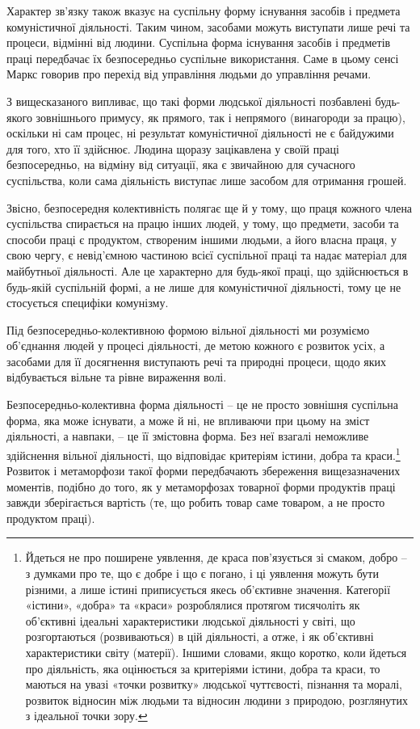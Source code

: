 \documentclass[../main]{subfiles}
\begin{document}
Характер зв’язку також вказує на суспільну форму існування засобів і предмета комуністичної діяльності. Таким чином, засобами можуть виступати лише речі та процеси, відмінні від людини. Суспільна форма існування засобів і предметів праці передбачає їх безпосередньо суспільне використання. Саме в цьому сенсі Маркс говорив про перехід від управління людьми до управління речами.

З вищесказаного випливає, що такі форми людської діяльності позбавлені будь-якого зовнішнього примусу, як прямого, так і непрямого (винагороди за працю), оскільки ні сам процес, ні результат комуністичної діяльності не є байдужими для того, хто її здійснює. Людина щоразу зацікавлена у своїй праці безпосередньо, на відміну від ситуації, яка є звичайною для сучасного суспільства, коли сама діяльність виступає лише засобом для отримання грошей.

Звісно, безпосередня колективність полягає ще й у тому, що праця кожного члена суспільства спирається на працю інших людей, у тому, що предмети, засоби та способи праці є продуктом, створеним іншими людьми, а його власна праця, у свою чергу, є невід’ємною частиною всієї суспільної праці та надає матеріал для майбутньої діяльності. Але це характерно для будь-якої праці, що здійснюється в будь-якій суспільній формі, а не лише для комуністичної діяльності, тому це не стосується специфіки комунізму.

Під безпосередньо-колективною формою вільної діяльності ми розуміємо об’єднання людей у процесі діяльності, де метою кожного є розвиток усіх, а засобами для її досягнення виступають речі та природні процеси, щодо яких відбувається вільне та рівне вираження волі.

Безпосередньо-колективна форма діяльності – це не просто зовнішня суспільна форма, яка може існувати, а може й ні, не впливаючи при цьому на зміст діяльності, а навпаки, – це її змістовна форма. Без неї взагалі неможливе здійснення вільної діяльності, що відповідає критеріям істини, добра та краси.\footnote{Йдеться не про поширене уявлення, де краса пов’язується зі смаком, добро – з думками про те, що є добре і що є погано, і ці уявлення можуть бути різними, а лише істині приписується якесь об’єктивне значення. Категорії «істини», «добра» та «краси» розроблялися протягом тисячоліть як об’єктивні ідеальні характеристики людської діяльності у світі, що розгортаються (розвиваються) в цій діяльності, а отже, і як об’єктивні характеристики світу (матерії). Іншими словами, якщо коротко, коли йдеться про діяльність, яка оцінюється за критеріями істини, добра та краси, то маються на увазі «точки розвитку» людської чуттєвості, пізнання та моралі, розвиток відносин між людьми та відносин людини з природою, розглянутих з ідеальної точки зору.} Розвиток і метаморфози такої форми передбачають збереження вищезазначених моментів, подібно до того, як у метаморфозах товарної форми продуктів праці завжди зберігається вартість (те, що робить товар саме товаром, а не просто продуктом праці).
\end{document}
